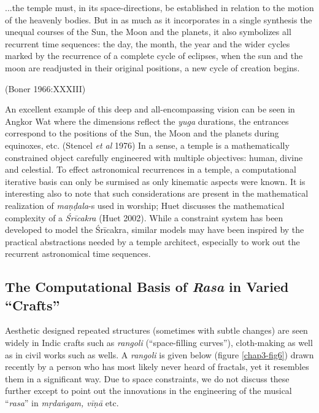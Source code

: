 \begin{myquote}
...the temple must, in its space-directions, be established in relation to the motion of the heavenly bodies. But in as much as it incorporates in a single synthesis the unequal courses of the Sun, the Moon and the planets, it also symbolizes all recurrent time sequences: the day, the month, the year and the wider cycles marked by the recurrence of a complete cycle of eclipses, when the sun and the moon are readjusted in their original positions, a new cycle of creation begins. 

\hfill(Boner 1966:XXXIII)
\end{myquote}

An excellent example of this deep and all-encompassing vision can be seen in Angkor Wat where the dimensions reflect the \textsl{yuga} durations, the entrances correspond to the positions of the Sun, the Moon and the planets during equinoxes, etc. (Stencel \textsl{et al} 1976) In a sense, a temple is a mathematically constrained object carefully engineered with multiple objectives: human, divine and celestial. To effect astronomical recurrences in a temple, a computational iterative basis can only be surmised as only kinematic aspects were known. It is interesting also to note that such considerations are present in the mathematical realization of \textsl{maṇḍala}-s used in worship; Huet discusses the mathematical complexity of a \textsl{Śrīcakra} (Huet 2002). While a constraint system has been developed to model the Śrīcakra, similar models may have been inspired by the practical abstractions needed by a temple architect, especially to work out the recurrent astronomical time sequences.\\[-20pt]

\subsection{The Computational Basis of \textsl{Rasa} in Varied “Crafts”}\label{chap3-sec5.4}

Aesthetic designed repeated structures (sometimes with subtle changes) are seen widely in Indic crafts such as \textsl{rangoli} (“space-filling curves”), cloth-making as well as in civil works such as wells. A \textsl{rangoli} is given below (figure \ref{chap3-fig6}) drawn recently by a person who has most likely never heard of fractals, yet it resembles them in a significant way. Due to space constraints, we do not discuss these further except to point out the innovations in the engineering of the musical “\textsl{rasa}” in \textsl{mṛdaṅgam, vīṇā} etc.

